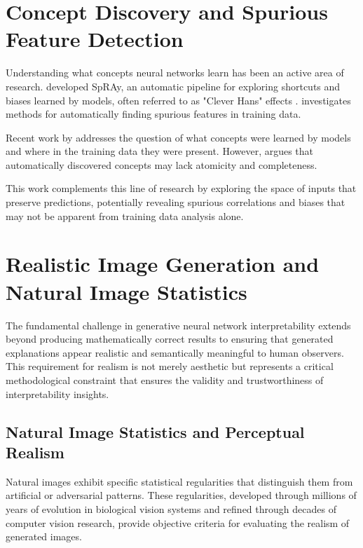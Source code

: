 \section{Concept Discovery and Spurious Feature Detection}

Understanding what concepts neural networks learn has been an active area of research. \citep{Lapuschkin_2019} developed SpRAy, an automatic pipeline for exploring shortcuts and biases learned by models, often referred to as "Clever Hans" effects \citep{pfungst1911cleverHans}. \citet{neuhaus2023spuriousfeatureslargescale} investigates methods for automatically finding spurious features in training data.

Recent work by \citet{dreyer2025mechanisticunderstandingvalidationlarge} addresses the question of what concepts were learned by models and where in the training data they were present. However, \citep{leask2025sparse} argues that automatically discovered concepts may lack atomicity and completeness.

This work complements this line of research by exploring the space of inputs that preserve predictions, potentially revealing spurious correlations and biases that may not be apparent from training data analysis alone.

\section{Realistic Image Generation and Natural Image Statistics}

The fundamental challenge in generative neural network interpretability extends beyond producing mathematically correct results to ensuring that generated explanations appear realistic and semantically meaningful to human observers. This requirement for realism is not merely aesthetic but represents a critical methodological constraint that ensures the validity and trustworthiness of interpretability insights.

\subsection{Natural Image Statistics and Perceptual Realism}

Natural images exhibit specific statistical regularities that distinguish them from artificial or adversarial patterns. These regularities, developed through millions of years of evolution in biological vision systems and refined through decades of computer vision research, provide objective criteria for evaluating the realism of generated images.

